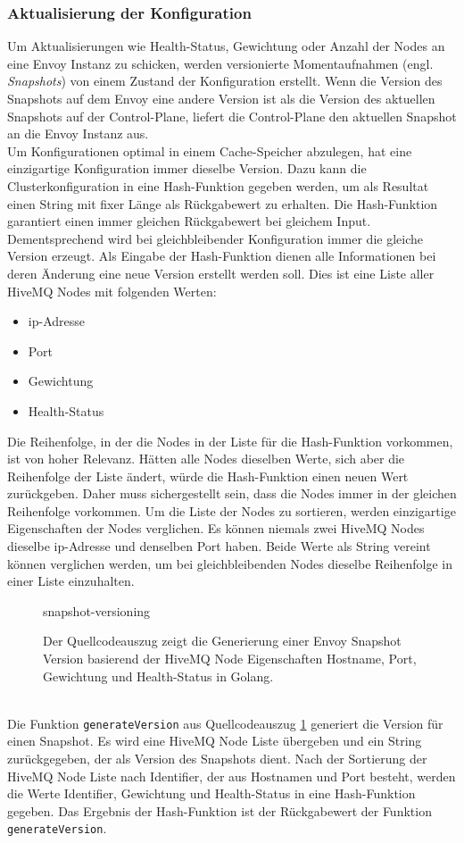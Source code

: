 \subsubsection{Aktualisierung der Konfiguration}
Um Aktualisierungen wie Health-Status, Gewichtung oder Anzahl der Nodes an eine Envoy Instanz zu schicken, werden versionierte Momentaufnahmen (engl. \textit{Snapshots}) von einem Zustand der Konfiguration erstellt. Wenn die Version des Snapshots auf dem Envoy eine andere Version ist als die Version des aktuellen Snapshots auf der Control-Plane, liefert die Control-Plane den aktuellen Snapshot an die Envoy Instanz aus.
\\
Um Konfigurationen optimal in einem Cache-Speicher abzulegen, hat eine einzigartige Konfiguration immer dieselbe Version.
Dazu kann die Clusterkonfiguration in eine Hash-Funktion gegeben werden, um als Resultat einen String mit fixer Länge als Rückgabewert zu erhalten.
Die Hash-Funktion garantiert einen immer gleichen Rückgabewert bei gleichem Input. Dementsprechend wird bei gleichbleibender Konfiguration immer die gleiche Version erzeugt.
Als Eingabe der Hash-Funktion dienen alle Informationen bei deren Änderung eine neue Version erstellt werden soll. Dies ist eine Liste aller HiveMQ Nodes mit folgenden Werten:
\begin{itemize}
  \item \ac{ip}-Adresse
  \item Port
  \item Gewichtung
  \item Health-Status
\end{itemize}
Die Reihenfolge, in der die Nodes in der Liste für die Hash-Funktion vorkommen, ist von hoher Relevanz.
Hätten alle Nodes dieselben Werte, sich aber die Reihenfolge der Liste ändert, würde die Hash-Funktion einen neuen Wert zurückgeben.
Daher muss sichergestellt sein, dass die Nodes immer in der gleichen Reihenfolge vorkommen.
Um die Liste der Nodes zu sortieren, werden einzigartige Eigenschaften der Nodes verglichen.
Es können niemals zwei HiveMQ Nodes dieselbe \ac{ip}-Adresse und denselben Port haben. Beide Werte als String vereint können verglichen werden, um bei gleichbleibenden Nodes dieselbe Reihenfolge in einer Liste einzuhalten.
\begin{figure}
    {snapshot-versioning}
    \caption{Der Quellcodeauszug zeigt die Generierung einer Envoy Snapshot Version basierend der HiveMQ Node Eigenschaften Hostname, Port, Gewichtung und Health-Status in Golang.}
    \label{code:snapshot-versioning}
\end{figure}
\\
Die Funktion \verb|generateVersion| aus Quellcodeauszug \ref{code:snapshot-versioning} generiert die Version für einen Snapshot. Es wird eine HiveMQ Node Liste übergeben und ein String zurückgegeben, der als Version des Snapshots dient. Nach der Sortierung der HiveMQ Node Liste nach Identifier, der aus Hostnamen und Port besteht, werden die Werte Identifier, Gewichtung und Health-Status in eine Hash-Funktion gegeben. Das Ergebnis der Hash-Funktion ist der Rückgabewert der Funktion \verb|generateVersion|.
\newpage

